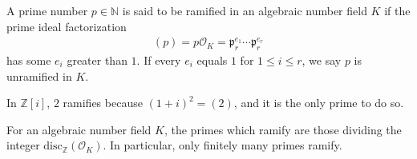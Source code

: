 \begin{defbox}
    \begin{definition}
        A prime number \(p \in \mathbb{N}\) is said to be ramified in an algebraic number field \(K\) if the prime ideal factorization
        \begin{align*}
            (p) = p \mathcal{O}_K = \mathfrak{p}_r^{e_1} \cdots \mathfrak{p}_r^{e_r}
        \end{align*}
        has some \(e_i\) greater than \(1\). If every \(e_i\) equals \(1\) for \(1 \leq i \leq r\), we say \(p\) is unramified in \(K\).
    \end{definition}
\end{defbox}

\begin{example}
    In \(\mathbb{Z}[i]\), \(2\) ramifies because \((1 + i)^2 = (2)\), and it is the only prime to do so.
\end{example}

\begin{thmbox}
    \begin{theorem}
        For an algebraic number field \(K\), the primes which ramify are those dividing the integer \(\mathrm{disc}_\mathbb{Z}(\mathcal{O}_K)\). In particular, only finitely many primes ramify.
    \end{theorem}
\end{thmbox}